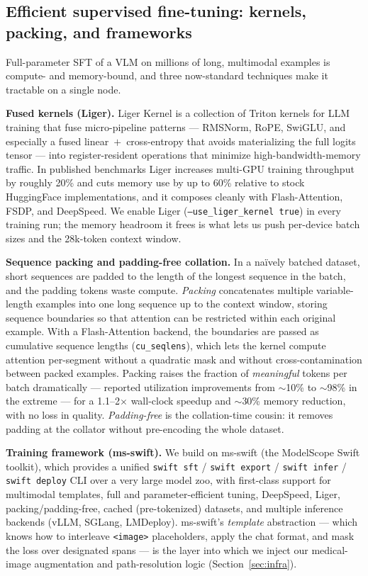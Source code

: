 \documentclass[11pt,a4paper]{article}
\begin{document}
\subsection{Efficient supervised fine-tuning: kernels, packing, and frameworks}
Full-parameter SFT of a VLM on millions of long, multimodal examples is compute- and memory-bound, and three now-standard techniques make it tractable on a single node.

\textbf{Fused kernels (Liger).} Liger Kernel is a collection of Triton kernels for LLM training that fuse micro-pipeline patterns --- RMSNorm, RoPE, SwiGLU, and especially a fused linear~$+$~cross-entropy that avoids materializing the full logits tensor --- into register-resident operations that minimize high-bandwidth-memory traffic. In published benchmarks Liger increases multi-GPU training throughput by roughly 20\% and cuts memory use by up to 60\% relative to stock HuggingFace implementations, and it composes cleanly with Flash-Attention, FSDP, and DeepSpeed. We enable Liger (\texttt{--use\_liger\_kernel true}) in every training run; the memory headroom it frees is what lets us push per-device batch sizes and the 28k-token context window.

\textbf{Sequence packing and padding-free collation.} In a naïvely batched dataset, short sequences are padded to the length of the longest sequence in the batch, and the padding tokens waste compute. \emph{Packing} concatenates multiple variable-length examples into one long sequence up to the context window, storing sequence boundaries so that attention can be restricted within each original example. With a Flash-Attention backend, the boundaries are passed as cumulative sequence lengths (\texttt{cu\_seqlens}), which lets the kernel compute attention per-segment without a quadratic mask and without cross-contamination between packed examples. Packing raises the fraction of \emph{meaningful} tokens per batch dramatically --- reported utilization improvements from $\sim$10\% to $\sim$98\% in the extreme --- for a 1.1--2$\times$ wall-clock speedup and $\sim$30\% memory reduction, with no loss in quality. \emph{Padding-free} is the collation-time cousin: it removes padding at the collator without pre-encoding the whole dataset.

\textbf{Training framework (ms-swift).} We build on ms-swift (the ModelScope Swift toolkit), which provides a unified \texttt{swift sft} / \texttt{swift export} / \texttt{swift infer} / \texttt{swift deploy} CLI over a very large model zoo, with first-class support for multimodal templates, full and parameter-efficient tuning, DeepSpeed, Liger, packing/padding-free, cached (pre-tokenized) datasets, and multiple inference backends (vLLM, SGLang, LMDeploy). ms-swift's \emph{template} abstraction --- which knows how to interleave \texttt{<image>} placeholders, apply the chat format, and mask the loss over designated spans --- is the layer into which we inject our medical-image augmentation and path-resolution logic (Section~\ref{sec:infra}).
\end{document}
